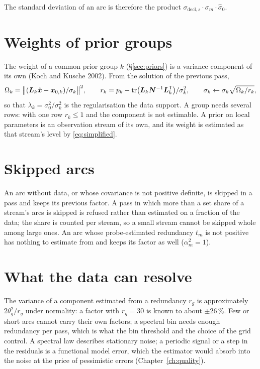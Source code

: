 The standard deviation of an arc is therefore the product
$\sigma_{\mathrm{decl},s}\cdot\sigma_m\cdot\hat\sigma_0$.

\section{Weights of prior groups}\label{sec:priorvce}

The weight of a common prior group $k$ (\S\ref{sec:priors}) is a variance component of its own
(Koch and Kusche 2002). From the solution of the previous pass,
\begin{equation}\label{eq:kochkusche}
\Omega_k=\bigl\|(\bm{L}_k\hat{\bm{x}}-\bm{x}_{0,k})/\sigma_k\bigr\|^2,\qquad
r_k=p_k-\operatorname{tr}\bigl(\bm{L}_k\bm{N}^{-1}\bm{L}_k^{\mathsf T}\bigr)/\sigma_k^2,\qquad
\sigma_k\leftarrow\sigma_k\sqrt{\Omega_k/r_k},
\end{equation}
so that $\lambda_k=\sigma_0^2/\sigma_k^2$ is the regularisation the data support. A group needs
several rows: with one row $r_k\le1$ and the component is not estimable. A prior on local
parameters is an observation stream of its own, and its weight is estimated as that stream's
level by \eqref{eq:simplified}.

\section{Skipped arcs}\label{sec:skips}

An arc without data, or whose covariance is not positive definite, is skipped in a pass and keeps
its previous factor. A pass in which more than a set share of a stream's arcs is skipped is refused
rather than estimated on a fraction of the data; the share is counted per stream, so a small stream
cannot be skipped whole among large ones. An arc whose probe-estimated redundancy $t_m$ is not
positive has nothing to estimate from and keeps its factor as well ($\alpha_m^2=1$).

\section{What the data can resolve}

The variance of a component estimated from a redundancy $r_g$ is approximately
$2\theta_g^2/r_g$ under normality: a factor with $r_g=30$ is known to about $\pm26\,\%$. Few or
short arcs cannot carry their own factors; a spectral bin needs enough redundancy per pass, which
is what the bin threshold and the choice of the grid control. A spectral law describes stationary
noise; a periodic signal or a step in the residuals is a functional model error, which the
estimator would absorb into the noise at the price of pessimistic errors
(Chapter~\ref{ch:quality}).
